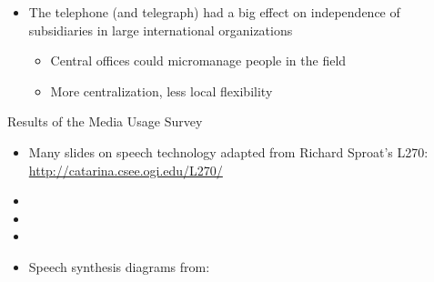 \documentclass[a4paper,landscape,headrule,footrule,xetex]{foils}
\begin{document}







\begin{itemize}
\item The telephone (and telegraph) had a big effect on independence
  of subsidiaries in large international organizations \citep{Parkinson:1958}
  \begin{itemize}
  \item Central offices could micromanage people in the field
  \item More centralization, less local flexibility 
  \end{itemize}
\end{itemize}


Results of the Media Usage Survey


\begin{itemize}
\item Many slides on speech technology adapted from Richard Sproat's L270: 
  \\ \url{http://catarina.csee.ogi.edu/L270/}
\item {}
\item {}
\item {}
\item Speech synthesis diagrams from: 
\end{itemize}




\end{document}
